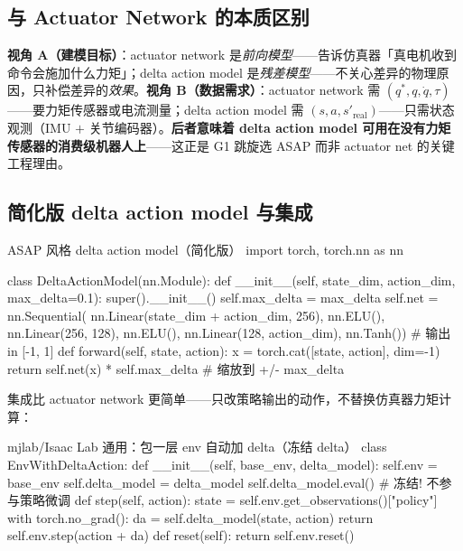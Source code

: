 \subsection{与 Actuator Network 的本质区别}
\label{sec:rlmc-act-delta-vs-net}

\begin{insight}\label{ins:rlmc-act-delta-dual}
\textbf{视角 A（建模目标）}：actuator network 是\emph{前向模型}——告诉仿真器「真电机收到命令会施加什么力矩」；delta action model 是\emph{残差模型}——不关心差异的物理原因，只补偿差异的\emph{效果}。\textbf{视角 B（数据需求）}：actuator network 需 $(q^*,q,\dot q,\tau)$——要力矩传感器或电流测量；delta action model 需 $(s,a,s'_{\text{real}})$——只需状态观测（IMU $+$ 关节编码器）。\textbf{后者意味着 delta action model 可用在没有力矩传感器的消费级机器人上}——这正是 G1 跳旋选 ASAP 而非 actuator net 的关键工程理由。
\end{insight}

\subsection{简化版 delta action model 与集成}
\label{sec:rlmc-act-delta-impl}

\begin{codebox}[Python]{ASAP 风格 delta action model（简化版）}
import torch, torch.nn as nn

class DeltaActionModel(nn.Module):
    def __init__(self, state_dim, action_dim, max_delta=0.1):
        super().__init__()
        self.max_delta = max_delta
        self.net = nn.Sequential(
            nn.Linear(state_dim + action_dim, 256), nn.ELU(),
            nn.Linear(256, 128), nn.ELU(),
            nn.Linear(128, action_dim), nn.Tanh())   # 输出 in [-1, 1]
    def forward(self, state, action):
        x = torch.cat([state, action], dim=-1)
        return self.net(x) * self.max_delta          # 缩放到 +/- max_delta
\end{codebox}

集成比 actuator network 更简单——只改策略输出的动作，不替换仿真器力矩计算：

\begin{codebox}[Python]{mjlab/Isaac Lab 通用：包一层 env 自动加 delta（冻结 delta）}
class EnvWithDeltaAction:
    def __init__(self, base_env, delta_model):
        self.env = base_env
        self.delta_model = delta_model
        self.delta_model.eval()                       # 冻结! 不参与策略微调
    def step(self, action):
        state = self.env.get_observations()["policy"]
        with torch.no_grad():
            da = self.delta_model(state, action)
        return self.env.step(action + da)
    def reset(self):
        return self.env.reset()
\end{codebox}

